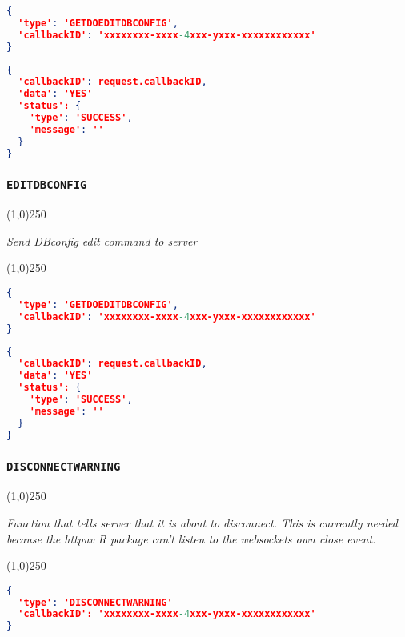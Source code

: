 \documentclass[A4,12pt, utf8]{article}
\begin{document}
\begin{lstlisting}[caption=Request content, language=json]
{
  'type': 'GETDOEDITDBCONFIG', 
  'callbackID': 'xxxxxxxx-xxxx-4xxx-yxxx-xxxxxxxxxxxx'
}
\end{lstlisting}

\begin{lstlisting}[caption=response content, language=json]
{
  'callbackID': request.callbackID,
  'data': 'YES'
  'status': {
    'type': 'SUCCESS',
    'message': ''
  }
}
\end{lstlisting}


\subsubsection{\texttt{EDITDBCONFIG}}
\label{EDITDBCONFIG}
\begin{center}
  \line(1,0){250}

  \textit{Send DBconfig edit command to server}

  \line(1,0){250}
\end{center}


\begin{lstlisting}[caption=Request content, language=json]
{
  'type': 'GETDOEDITDBCONFIG', 
  'callbackID': 'xxxxxxxx-xxxx-4xxx-yxxx-xxxxxxxxxxxx'
}
\end{lstlisting}

\begin{lstlisting}[caption=response content, language=json]
{
  'callbackID': request.callbackID,
  'data': 'YES'
  'status': {
    'type': 'SUCCESS',
    'message': ''
  }
}
\end{lstlisting}

\subsubsection{\texttt{DISCONNECTWARNING}}
\begin{center}
  \line(1,0){250}

  \textit{Function that tells server that it is about to disconnect. This is currently needed because the httpuv R package can't listen to the websockets own close event.}

  \line(1,0){250}
\end{center}


\begin{lstlisting}[caption=Request content, language=json]
{
  'type': 'DISCONNECTWARNING'
  'callbackID': 'xxxxxxxx-xxxx-4xxx-yxxx-xxxxxxxxxxxx'
}
\end{lstlisting}
\end{document}
